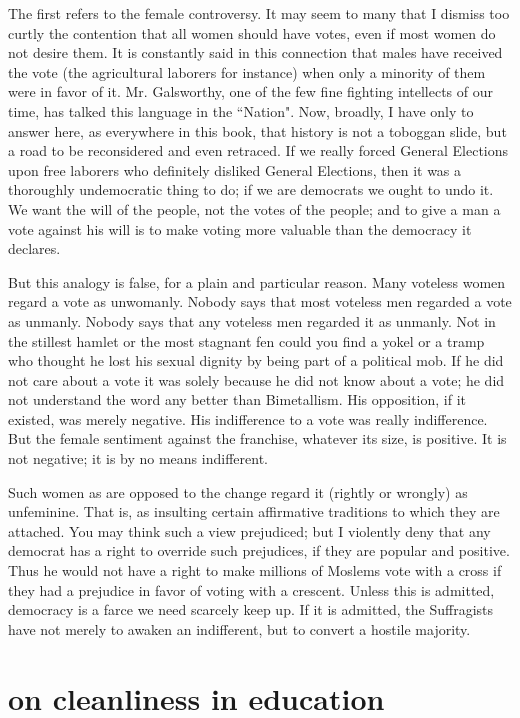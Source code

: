 \documentclass[final,10pt,letterpaper,twocolumn,openany]{book}
\begin{document}
The first refers to the female controversy. It may seem to many that I
dismiss too curtly the contention that all women should have votes, even if
most women do not desire them. It is constantly said in this connection
that males have received the vote (the agricultural laborers for instance)
when only a minority of them were in favor of it. Mr. Galsworthy, one of
the few fine fighting intellects of our time, has talked this language in the
``Nation". Now, broadly, I have only to answer here, as everywhere in this
book, that history is not a toboggan slide, but a road to be reconsidered
and even retraced. If we really forced General Elections upon free laborers
who definitely disliked General Elections, then it was a thoroughly
undemocratic thing to do; if we are democrats we ought to undo it. We
want the will of the people, not the votes of the people; and to give a man
a vote against his will is to make voting more valuable than the democracy
it declares.

But this analogy is false, for a plain and particular reason. Many
voteless women regard a vote as unwomanly. Nobody says that most
voteless men regarded a vote as unmanly. Nobody says that any voteless
men regarded it as unmanly. Not in the stillest hamlet or the most stagnant
fen could you find a yokel or a tramp who thought he lost his sexual
dignity by being part of a political mob. If he did not care about a vote it
was solely because he did not know about a vote; he did not understand
the word any better than Bimetallism. His opposition, if it existed, was
merely negative. His indifference to a vote was really indifference. But the
female sentiment against the franchise, whatever its size, is positive. It is
not negative; it is by no means indifferent.

Such women as are opposed to
the change regard it (rightly or wrongly) as unfeminine. That is, as
insulting certain affirmative traditions to which they are attached. You may
think such a view prejudiced; but I violently deny that any democrat has a
right to override such prejudices, if they are popular and positive. Thus he
would not have a right to make millions of Moslems vote with a cross if
they had a prejudice in favor of voting with a crescent. Unless this is
admitted, democracy is a farce we need scarcely keep up. If it is admitted,
the Suffragists have not merely to awaken an indifferent, but to convert a
hostile majority.

\section{on cleanliness in education}
\end{document}
